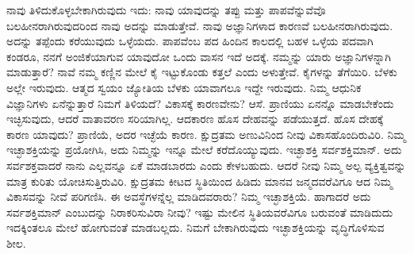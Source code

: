 ನಾವು ತಿಳಿದುಕೊಳ್ಳಬೇಕಾಗಿರುವುದು ಇದು: ನಾವು ಯಾವುದನ್ನು ತಪ್ಪು ಮತ್ತು ಪಾಪವೆನ್ನುವೆವೊ ಬಲಹೀನರಾಗಿರುವುದರಿಂದ ನಾವು ಅದನ್ನು ಮಾಡುತ್ತೇವೆ. ನಾವು ಅಜ್ಞಾನಿ\break ಗಳಾದ ಕಾರಣವೆ ಬಲಹೀನರಾಗಿರುವುದು. ಅದನ್ನು ತಪ್ಪೆಂದು ಕರೆಯುವುದು ಒಳ್ಳೆಯದು. ಪಾಪವೆಂಬ ಪದ ಹಿಂದಿನ ಕಾಲದಲ್ಲಿ ಬಹಳ ಒಳ್ಳೆಯ ಪದವಾಗಿ ಕಂಡರೂ, ನನಗೆ ಅಂಜಿಕೆಯಾಗುವ ಯಾವುದೋ ಒಂದು ವಾಸನ ಇದೆ ಅದಕ್ಕೆ. ನಮ್ಮನ್ನು ಯಾರು ಅಜ್ಞಾನಿಗಳನ್ನಾಗಿ ಮಾಡುತ್ತಾರೆ? ನಾವೆ ನಮ್ಮ ಕಣ್ಣಿನ ಮೇಲೆ ಕೈ ಇಟ್ಟುಕೊಂಡು ಕತ್ತಲೆ ಎಂದು ಅಳುತ್ತೇವೆ. ಕೈಗಳನ್ನು ತೆಗೆಯಿರಿ. ಬೆಳಕು ಅಲ್ಲೇ ಇರುವುದು. ಆತ್ಮದ ಸ್ವಯಂ ಜ್ಯೋತಿಯ ಬೆಳಕು ಯಾವಾಗಲೂ ಇದ್ದೇ ಇರುವುದು. ನಿಮ್ಮ ಆಧುನಿಕ ವಿಜ್ಞಾನಿಗಳು ಏನೆನ್ನುತ್ತಾರೆ ನಿಮಗೆ ತಿಳಿಯದೆ? ವಿಕಾಸಕ್ಕೆ ಕಾರಣವೇನು? ಆಸೆ. ಪ್ರಾಣಿಯು ಏನನ್ನೊ ಮಾಡಬೇಕೆಂದು ಇಚ್ಛಿಸುವುದು, ಆದರೆ ವಾತಾವರಣ ಸರಿಯಾಗಿಲ್ಲ. ಆದಕಾರಣ ಹೊಸ ದೇಹವನ್ನು ಪಡೆಯುತ್ತದೆ. ಹೊಸ ದೇಹಕ್ಕೆ ಕಾರಣ ಯಾವುದು? ಪ್ರಾಣಿಯೆ, ಅದರ ಇಚ್ಛೆಯೆ ಕಾರಣ. ಕ್ಷುದ್ರತಮ ಅಣುವಿನಿಂದ ನೀವು ವಿಕಾಸಹೊಂದಿರುವಿರಿ. ನಿಮ್ಮ ಇಚ್ಛಾಶಕ್ತಿಯನ್ನು ಪ್ರಯೋಗಿಸಿ, ಅದು ನಿಮ್ಮನ್ನು ಇನ್ನೂ ಮೇಲೆ ಕರೆದೊಯ್ಯುವುದು. ಇಚ್ಛಾಶಕ್ತಿ ಸರ್ವಶಕ್ತಿಮಾನ್​. ಅದು ಸರ್ವಶಕ್ತವಾದರೆ ನಾನು ಎಲ್ಲವನ್ನೂ ಏಕೆ ಮಾಡಬಾರದು ಎಂದು ಕೇಳಬಹುದು. ಆದರೆ ನೀವು ನಿಮ್ಮ ಅಲ್ಪ ವ್ಯಕ್ತಿತ್ವವನ್ನು ಮಾತ್ರ ಕುರಿತು ಯೋಚಿಸುತ್ತಿರುವಿರಿ. ಕ್ಷುದ್ರತಮ ಕೀಟದ ಸ್ಥಿತಿಯಿಂದ ಹಿಡಿದು ಮಾನವ ಜನ್ಮದವರೆವಿಗೂ ಆದ ನಿಮ್ಮ ವಿಕಾಸವನ್ನು ನೀವೆ ಪರಿಗಣಿಸಿ. ಈ ಅವಸ್ಥೆಗಳನ್ನೆಲ್ಲ ಮಾಡಿದವರಾರು? ನಿಮ್ಮ ಇಚ್ಛಾಶಕ್ತಿಯೆ. ಹಾಗಾದರೆ ಅದು ಸರ್ವಶಕ್ತಿಮಾನ್​ ಎಂಬುದನ್ನು ನಿರಾಕರಿಸುವಿರಾ ನೀವು? ಇಷ್ಟು ಮೇಲಿನ ಸ್ಥಿತಿಯವರೆವಿಗೂ ಬರುವಂತೆ ಮಾಡಿದುದು ಇದಕ್ಕಿಂತಲೂ ಮೇಲೆ ಹೋಗುವಂತೆ ಮಾಡಬಲ್ಲದು. ನಿಮಗೆ ಬೇಕಾಗಿರುವುದು ಇಚ್ಛಾಶಕ್ತಿಯನ್ನು ವೃದ್ಧಿಗೊಳಿಸುವ ಶೀಲ. 

\vskip 0.2cm


